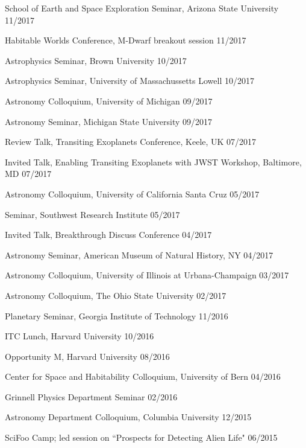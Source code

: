 \documentclass[12pt,letterpaper]{article}
\begin{document}
\begin{compactitem}[]
\item {School of Earth and Space Exploration Seminar, Arizona State University \hfill 11/2017}
\item {Habitable Worlds Conference, M-Dwarf breakout session \hfill 11/2017}
\item {Astrophysics Seminar, Brown University \hfill 10/2017}
\item {Astrophysics Seminar, University of Massachussetts Lowell \hfill 10/2017}
\item {Astronomy Colloquium, University of Michigan \hfill 09/2017}
\item {Astronomy Seminar, Michigan State University \hfill 09/2017}
\item {Review Talk, Transiting Exoplanets Conference, Keele, UK \hfill 07/2017}
\item {Invited Talk, Enabling Transiting Exoplanets with JWST Workshop, Baltimore, MD \hfill 07/2017}
\item {Astronomy Colloquium, University of California Santa Cruz \hfill 05/2017}
\item {Seminar, Southwest Research Institute \hfill 05/2017}
\item {Invited Talk, Breakthrough Discuss Conference \hfill 04/2017}
\item {Astronomy Seminar, American Museum of Natural History, NY \hfill 04/2017}
\item {Astronomy Colloquium, University of Illinois at Urbana-Champaign \hfill 03/2017}
\item {Astronomy Colloquium, The Ohio State University \hfill 02/2017}
\item {Planetary Seminar, Georgia Institute of Technology \hfill 11/2016}
\item {ITC Lunch, Harvard University \hfill 10/2016}
\item {Opportunity M, Harvard University \hfill 08/2016}
\item {Center for Space and Habitability Colloquium, University of Bern \hfill 04/2016}
\item {Grinnell Physics Department Seminar \hfill 02/2016}
\item {Astronomy Department Colloquium, Columbia University \hfill 12/2015}
\item {SciFoo Camp; led session on ``Prospects for Detecting Alien Life" \hfill 06/2015}

\end{compactitem}
\end{document}
